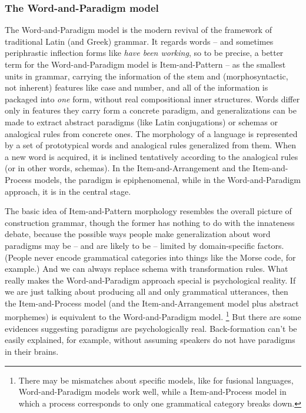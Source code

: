 \documentclass[UTF8, a4paper, oneside, scheme=plain]{ctexart}
\newcommand*{\corpus}[1]{\emph{#1}}
\begin{document}
\subsubsection{The Word-and-Paradigm model}\label{sec:word-and-paradigm}

The Word-and-Paradigm model is the modern revival of the framework of traditional Latin (and Greek) grammar.
It regards words 
-- and sometimes periphrastic inflection forms like \corpus{have been working},
so to be precise, a better term for the Word-and-Paradigm model is Item-and-Pattern
-- as the smallest units in grammar,
carrying the information of the stem 
and (morphosyntactic, not inherent) features like case and number,
and all of the information is packaged into \emph{one} form,
without real compositional inner structures.
Words differ only in features they carry 
form a concrete paradigm,
and generalizations can be made to extract 
abstract paradigms (like Latin conjugations) or schemas or analogical rules
from concrete ones.
The morphology of a language is represented by a set of prototypical words 
and analogical rules generalized from them.
When a new word is acquired, 
it is inclined tentatively according to the analogical rules (or in other words, schemas).
In the Item-and-Arrangement and the Item-and-Process models,
the paradigm is epiphenomenal,
while in the Word-and-Paradigm approach, 
it is in the central stage.

The basic idea of Item-and-Pattern morphology resembles the overall picture of construction grammar,
though the former has nothing to do with the innateness debate,
because the possible ways people make generalization about word paradigms
may be -- and are likely to be -- limited by domain-specific factors.
(People never encode grammatical categories into things like the Morse code, for example.)
And we can always replace schema with transformation rules.
What really makes the Word-and-Paradigm approach special 
is psychological reality.
If we are just talking about producing all and only grammatical utterances,
then the Item-and-Process model (and the Item-and-Arrangement model plus abstract morphemes)
is equivalent to the Word-and-Paradigm model.%
\footnote{
    There may be mismatches about specific models,
    like for fusional languages,
    Word-and-Paradigm models work well, 
    while a Item-and-Process model in which a process corresponds to only one grammatical category 
    breaks down.
}
But there are some evidences suggesting paradigms are psychologically real.
Back-formation can't be easily explained, for example,
without assuming speakers do not have paradigms in their brains.
\end{document}
